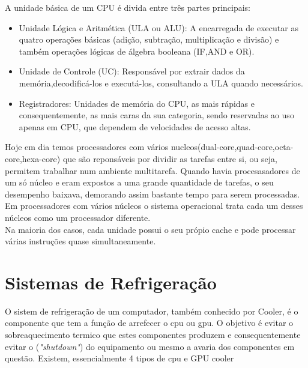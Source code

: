A unidade básica de um CPU é divida entre três partes principais:
\begin{itemize}
\item Unidade Lógica e Aritmética (ULA ou ALU): A encarregada de executar as quatro operações básicas (adição, subtração, multiplicação e divisão) e também operações lógicas de álgebra booleana (IF,AND e OR).
\item Unidade de Controle (UC): Responsável por extrair dados da memória,decodificá-los e executá-los, consultando a ULA quando necessários.
\item Registradores: Unidades de memória do CPU, as mais rápidas e consequentemente, as mais caras da sua categoria, sendo reservadas ao uso apenas em CPU, que dependem de velocidades de acesso altas.\\
\end{itemize}
Hoje em dia temos processadores com vários nucleos(dual-core,quad-core,octa-core,hexa-core) que são reponsáveis por dividir as tarefas entre si, ou seja, permitem trabalhar num ambiente multitarefa. Quando havia procesasadores de um só núcleo e eram expostos a uma grande quantidade de tarefas, o seu desempenho baixava, demorando assim bastante tempo para serem processadas. Em processadores com vários núcleos o sistema operacional trata cada um desses núcleos como um processador diferente.\\
Na maioria dos casos, cada unidade possui o seu própio cache e pode processar várias instruções quase simultaneamente.









\chapter{Sistemas de Refrigeração}
\label{chap.refrigeração}
O sistem de refrigeração de um computador, também conhecido por Cooler, é o componente que tem a função de arrefecer o \ac{cpu} ou \ac{gpu}. O objetivo é evitar o sobreaquecimento termico que estes componentes produzem e consequentemente evitar o (\textit{"shutdown"}) do equipamento ou mesmo a avaria dos componentes em questão.
Existem, essencialmente 4 tipos de \ac{cpu} e {GPU} cooler 


